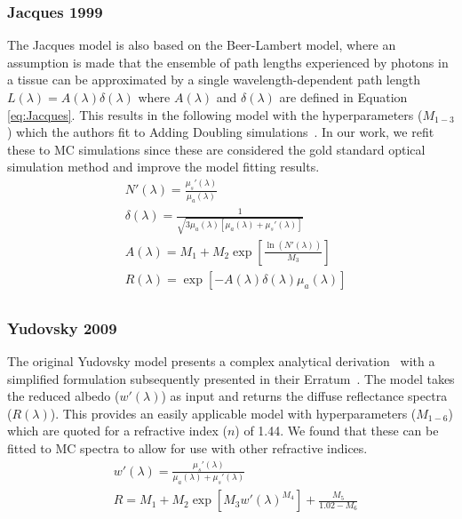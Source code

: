\subsubsection{Jacques 1999}\label{sec:Jacques}
The Jacques model is also based on the Beer-Lambert model, where an assumption is made that the ensemble of path lengths experienced by photons in a tissue can be approximated by a single wavelength-dependent path length $L(\lambda) = A(\lambda)\delta(\lambda)$ where $A(\lambda)$ and $\delta(\lambda)$ are defined in Equation \ref{eq:Jacques}. This results in the following model with the hyperparameters ($M_{1-3}$) which the authors
fit
to Adding Doubling simulations~\citep{Jacques1999}. In our work, we refit these to MC simulations since these are considered the gold standard optical simulation method and improve the model fitting results. 
\begin{equation}
\begin{aligned}
    & N'(\lambda) = \frac{\mu_s'(\lambda)}{\mu_a(\lambda)} \\
    & \delta(\lambda) = \frac{1}{\sqrt{3\mu_a(\lambda)[\mu_a(\lambda) + \mu_s'(\lambda)]}} \\
    & A(\lambda) = M_1 + M_2\exp \left[ \frac{\ln(N'(\lambda))}{M_3} \right] \\
    & R(\lambda) = \exp[-A(\lambda)\delta(\lambda)\mu_a(\lambda)] \\
\end{aligned}
\label{eq:Jacques}
\end{equation}

\subsubsection{Yudovsky 2009}\label{sec:Yudovskysingle}
The original Yudovsky model presents a complex analytical derivation~\citep{Yudovsky2009} with a simplified formulation subsequently presented in their Erratum~\citep{Yudovsky2015}. The model takes the reduced albedo ($w'(\lambda)$) as input and returns the diffuse reflectance spectra ($R(\lambda)$). This provides an easily applicable model with hyperparameters ($M_{1-6}$) which are quoted for a refractive index ($n$) of 1.44. We found that these can be fitted to MC spectra to allow for use with other refractive indices. 
\begin{equation}
\begin{aligned}
    & w'(\lambda) = \frac{\mu_s'(\lambda)}{\mu_a(\lambda) + \mu_s'(\lambda)} \\
    & R = M_1 + M_2\exp{\left[ M_3w'(\lambda)^{M_4}\right]} + \frac{M_5}{1.02 - M_6} \\
\end{aligned}
\label{eq:Yudovskysingle}
\end{equation} 

